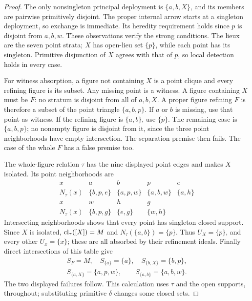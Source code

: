 \begin{proof}
The only nonsingleton principal deployment is $\{a,b,X\}$, and
its members are pairwise primitively disjoint. The proper internal
arrow starts at a singleton deployment, so exchange is immediate.
Its heredity requirement holds since $p$ is disjoint from $a,b,w$.
These observations verify the strong conditions. The lieux are
the seven point strata; $X$ has open-lieu set $\{p\}$, while
each point has its singleton. Primitive disjunction of $X$ agrees
with that of $p$, so local detection holds in every case.

For witness absorption, a figure not containing $X$ is a point
clique and every refining figure is its subset. Any missing point
is a witness. A figure containing $X$ must be $F$: no stratum is
disjoint from all of $a,b,X$. A proper figure refining $F$ is
therefore a subset of the point triangle $\{a,b,p\}$. If $a$ or
$b$ is missing, use that point as witness. If the refining figure
is $\{a,b\}$, use $\{p\}$. The remaining case is $\{a,b,p\}$;
no nonempty figure is disjoint from it, since the three point
neighborhoods have empty intersection. The separation premise
then fails. The case of the whole $F$ has a false premise too.

The whole-figure relation $\tau$ has the nine displayed point
edges and makes $X$ isolated. Its point neighborhoods are
\[
\begin{array}{c|cccc}
x&a&b&p&e\\\hline
N_\tau(x)&\{b,p,e\}&\{a,p,w\}&\{a,b,w\}&\{a,h\}\\[3pt]
x&w&h&g&\\\hline
N_\tau(x)&\{b,p,g\}&\{e,g\}&\{w,h\}&
\end{array}
\]
Intersecting neighborhoods shows that every point has singleton
closed support. Since $X$ is isolated, $\operatorname{cl}_\tau([X])=M$ and
$N_\tau(\{a,b\})=\{p\}$. Thus $U_X=\{p\}$, and every other
$U_x=\{x\}$; these are all absorbed by their refinement ideals.
Finally direct intersections of this table give
\[
\begin{gathered}
 S_F=M,\quad S_{\{a\}}=\{a\},\quad
 S_{\{b,X\}}=\{b,p\},\\
 S_{\{a,X\}}=\{a,p,w\},\qquad
 S_{\{a,b\}}=\{a,b,w\}.
\end{gathered}
\]
The two displayed failures follow. This calculation uses $\tau$
and the open supports, throughout; substituting primitive
$\delta$ changes some closed sets.
\end{proof}
